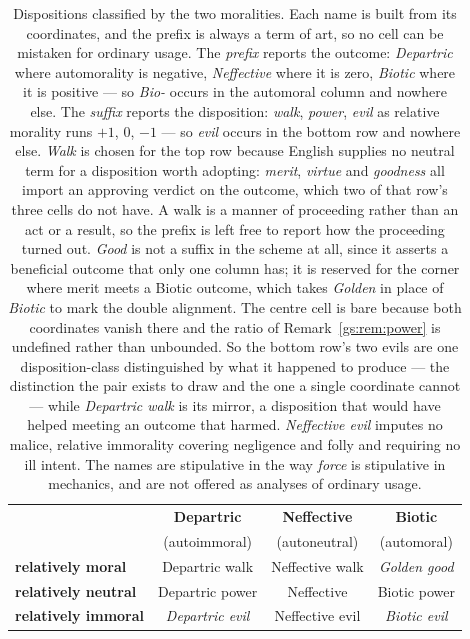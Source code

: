 \documentclass[11pt]{article}
\numberwithin{equation}{section}
\theoremstyle{plain}
\theoremstyle{definition}
\theoremstyle{remark}
\begin{document}
\begin{table}[htbp]
\centering\small
\begin{tabular}{@{}lccc@{}}
\toprule
& \textbf{Departric} & \textbf{Neffective} & \textbf{Biotic}\\
& \small(autoimmoral) & \small(autoneutral) & \small(automoral)\\
\midrule
\textbf{relatively moral}   & Departric walk    & Neffective walk  & \emph{Golden good}\\
\textbf{relatively neutral} & Departric power   & Neffective       & Biotic power\\
\textbf{relatively immoral} & \emph{Departric evil} & Neffective evil & \emph{Biotic evil}\\
\bottomrule
\end{tabular}
\caption{Dispositions classified by the two moralities. Each name is
built from its coordinates, and the prefix is always a term of art, so no
cell can be mistaken for ordinary usage. The \emph{prefix} reports the
outcome: \emph{Departric} where automorality is negative,
\emph{Neffective} where it is zero, \emph{Biotic} where it is positive
--- so \emph{Bio-} occurs in the automoral column and nowhere else. The
\emph{suffix} reports the disposition: \emph{walk}, \emph{power},
\emph{evil} as relative morality runs $+1$, $0$, $-1$ --- so
\emph{evil} occurs in the bottom row and nowhere else. \emph{Walk} is
chosen for the top row because English supplies no neutral term for a
disposition worth adopting: \emph{merit}, \emph{virtue} and
\emph{goodness} all import an approving verdict on the outcome, which two
of that row's three cells do not have. A walk is a manner of proceeding
rather than an act or a result, so the prefix is left free to report how
the proceeding turned out. \emph{Good} is not
a suffix in the scheme at all, since it asserts a beneficial outcome that
only one column has; it is reserved for the corner where merit meets a
Biotic outcome, which takes \emph{Golden} in place of \emph{Biotic} to
mark the double alignment. The centre cell is bare because both
coordinates vanish there and the ratio of
Remark~\ref{gs:rem:power} is undefined rather than unbounded. So the
bottom row's two evils are one disposition-class distinguished by what it
happened to produce --- the distinction the pair exists to draw and the
one a single coordinate cannot --- while \emph{Departric walk} is its
mirror, a disposition that would have helped meeting an outcome that
harmed. \emph{Neffective evil} imputes no malice, relative immorality
covering negligence and folly and requiring no ill intent. The names are
stipulative in the way \emph{force} is stipulative in mechanics, and are
not offered as analyses of ordinary usage.}\label{gs:tab:moralities}
\end{table}
\end{document}
